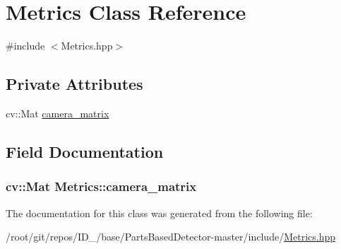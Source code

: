 \hypertarget{classMetrics}{\section{\-Metrics \-Class \-Reference}
\label{classMetrics}
}


{\ttfamily \#include $<$\-Metrics.\-hpp$>$}

\subsection*{\-Private \-Attributes}
\begin{DoxyCompactItemize}
\item 
cv\-::\-Mat \hyperlink{classMetrics_aba72e7e31eb9057d1252e61cdf3aa904}{camera\-\_\-matrix}
\end{DoxyCompactItemize}


\subsection{\-Field \-Documentation}
\hypertarget{classMetrics_aba72e7e31eb9057d1252e61cdf3aa904}{
\subsubsection[{camera\-\_\-matrix}]{\setlength{\rightskip}{0pt plus 5cm}cv\-::\-Mat {\bf \-Metrics\-::camera\-\_\-matrix}}}\label{classMetrics_aba72e7e31eb9057d1252e61cdf3aa904}


\-The documentation for this class was generated from the following file\-:\begin{DoxyCompactItemize}
\item 
/root/git/repos/\-I\-D\-\_/base/\-Parts\-Based\-Detector-\/master/include/\hyperlink{Metrics_8hpp}{\-Metrics.\-hpp}\end{DoxyCompactItemize}
